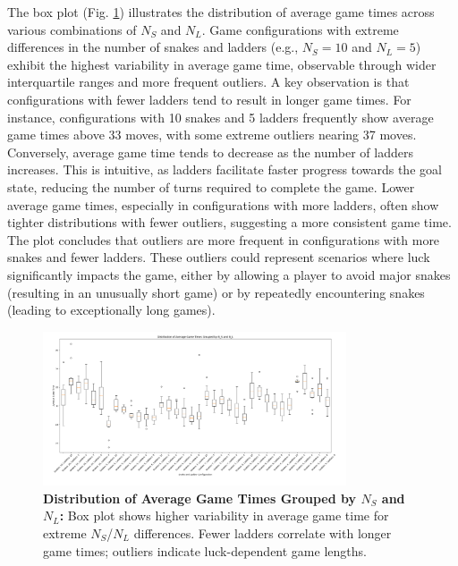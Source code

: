 The box plot (Fig. \ref{fig:boxplots}) illustrates the distribution of average game times across various combinations of $N_S$ and $N_L$. Game configurations with extreme differences in the number of snakes and ladders (e.g., $N_S = 10$ and $N_L = 5$) exhibit the highest variability in average game time, observable through wider interquartile ranges and more frequent outliers. A key observation is that configurations with fewer ladders tend to result in longer game times. For instance, configurations with 10 snakes and 5 ladders frequently show average game times above 33 moves, with some extreme outliers nearing 37 moves. Conversely, average game time tends to decrease as the number of ladders increases. This is intuitive, as ladders facilitate faster progress towards the goal state, reducing the number of turns required to complete the game. Lower average game times, especially in configurations with more ladders, often show tighter distributions with fewer outliers, suggesting a more consistent game time. The plot concludes that outliers are more frequent in configurations with more snakes and fewer ladders. These outliers could represent scenarios where luck significantly impacts the game, either by allowing a player to avoid major snakes (resulting in an unusually short game) or by repeatedly encountering snakes (leading to exceptionally long games).

\begin{figure}[th]
	\centering
	\includegraphics[width=0.8\textwidth]{"../Chapter 1/BoxPlots"}
	\caption{\textbf{Distribution of Average Game Times Grouped by $N_S$ and $N_L$:} Box plot shows higher variability in average game time for extreme $N_S$/$N_L$ differences. Fewer ladders correlate with longer game times; outliers indicate luck-dependent game lengths.}
	\label{fig:boxplots}
\end{figure}

